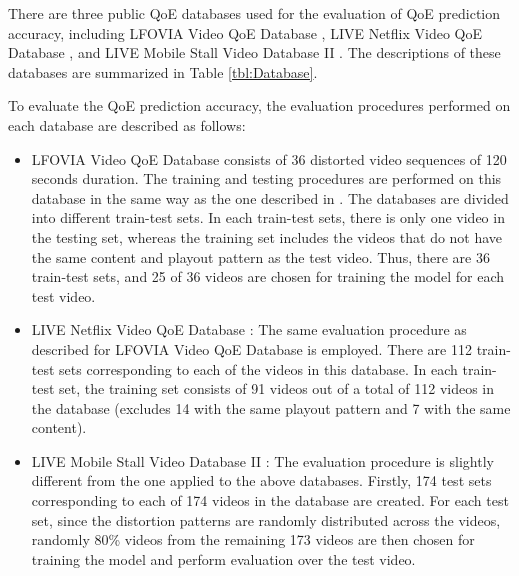 There are three public QoE databases used for the evaluation of QoE prediction accuracy, including LFOVIA Video QoE Database \cite{LFOVIA}, LIVE Netflix Video QoE Database \cite{NetflixQoE}, and LIVE Mobile Stall Video Database II \cite{StallingEvents}.
The descriptions of these databases are summarized in Table \ref{tbl:Database}.

To evaluate the QoE prediction accuracy, the evaluation procedures performed on each database are described as follows:
\begin{itemize}
  \item
    LFOVIA Video QoE Database \cite{LFOVIA} consists of 36 distorted video sequences of 120 seconds duration.
    The training and testing procedures are performed on this database in the same way as the one described in \cite{QoEModel_LSTM}.
    The databases are divided into different train-test sets.
    In each train-test sets, there is only one video in the testing set, whereas the training set includes the videos that do not have the same content and playout pattern as the test video. 
    Thus, there are 36 train-test sets, and 25 of 36 videos are chosen for training the model for each test video.

  \item
    LIVE Netflix Video QoE Database \cite{NetflixQoE}:
    The same evaluation procedure as described for LFOVIA Video QoE Database is employed.
    There are 112 train-test sets corresponding to each of the videos in this database.
    In each train-test set, the training set consists of 91 videos out of a total of 112 videos in the database (excludes 14 with the same playout pattern and 7 with the same content).
  
  \item
    LIVE Mobile Stall Video Database II \cite{StallingEvents}:
    The evaluation procedure is slightly different from the one applied to the above databases.
    Firstly, 174 test sets corresponding to each of 174 videos in the database are created.
    For each test set, since the distortion patterns are randomly distributed across the videos, randomly 80\% videos from the remaining 173 videos are then chosen for training the model and perform evaluation over the test video.

\end{itemize}

